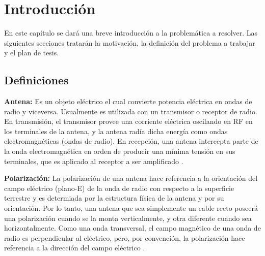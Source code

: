 
\chapter{Introducción} %

\label{ch:introduccion} %

En este capítulo se dará una breve introducción a la problemática a resolver. Las siguientes secciones tratarán la motivación,
la definición del problema a trabajar y el plan de tesis.

\section{Definiciones}

{\textbf{Antena:}} Es un objeto eléctrico el cual convierte potencia eléctrica en ondas de radio y viceversa. Usualmente es 
utilizada con un transmisor o receptor de radio. En transmisión, el transmisor provee una corriente eléctrica oscilando en 
RF en los terminales de la antena, y la antena radía dicha energía como ondas electromagnéticas (ondas de radio). En 
recepción, una antena intercepta parte de la onda electromagnética en orden de producir una mínima tensión en sus terminales,
que es aplicado al receptor a ser amplificado \cite{AntennaWiki}.

{\textbf{Polarización:}} La polarización de una antena hace referencia a la orientación del campo eléctrico (plano-E) de la 
onda de radio con respecto a la superficie terrestre y es determiada por la estructura física de la antena y por su 
orientación. Por lo tanto, una antena que sea simplemente un cable recto poseerá una polarización cuando se la monta 
verticalmente, y otra diferente cuando sea horizontalmente. Como una onda transversal, el campo magnético de una onda de 
radio es perpendicular al eléctrico, pero, por convención, la polarización hace referencia a la dirección del campo 
eléctrico \cite{AntennaWiki}.


